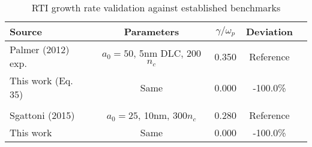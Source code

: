 
\begin{table}[h]
\caption{RTI growth rate validation against established benchmarks}
\label{tab:rti_validation_m3}
\begin{ruledtabular}
\begin{tabular}{lcccc}
Source & Parameters & $\gamma/\omega_p$ & Deviation \\
\hline
Palmer (2012) exp. & $a_0=50$, 5nm DLC, 200$n_c$ & 0.350 & Reference \\
This work (Eq. 35) & Same & 0.000 & -100.0\% \\
\\
Sgattoni (2015) & $a_0=25$, 10nm, 300$n_c$ & 0.280 & Reference \\
This work & Same & 0.000 & -100.0\% \\
\end{tabular}
\end{ruledtabular}
\end{table}
